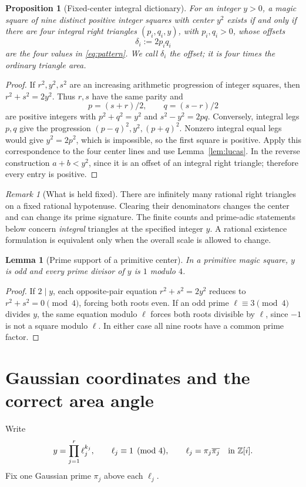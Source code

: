 \documentclass[11pt,letterpaper]{article}
\newtheorem{proposition}[theorem]{Proposition}
\newtheorem{lemma}[theorem]{Lemma}
\theoremstyle{definition}\newtheorem{definition}[theorem]{Definition}
\theoremstyle{remark}\newtheorem{remark}[theorem]{Remark}
\begin{document}
\begin{proposition}[Fixed-center integral dictionary]\label{prop:dictionary}
For an integer $y>0$, a magic square of nine distinct positive integer squares with center $y^2$ exists if and only if there are four integral right triangles $(p_i,q_i,y)$, with $p_i,q_i>0$, whose offsets
\[
\delta_i:=2p_iq_i
\]
are the four values in \eqref{eq:pattern}. We call $\delta_i$ the \emph{offset}; it is four times the ordinary triangle area.
\end{proposition}
\begin{proof}
If $r^2,y^2,s^2$ are an increasing arithmetic progression of integer squares, then $r^2+s^2=2y^2$. Thus $r,s$ have the same parity and
\[
p=(s+r)/2,\qquad q=(s-r)/2
\]
are positive integers with $p^2+q^2=y^2$ and $s^2-y^2=2pq$. Conversely, integral legs $p,q$ give the progression $(p-q)^2,y^2,(p+q)^2$. Nonzero integral equal legs would give $y^2=2p^2$, which is impossible, so the first square is positive. Apply this correspondence to the four center lines and use Lemma~\ref{lem:lucas}. In the reverse construction $a+b<y^2$, since it is an offset of an integral right triangle; therefore every entry is positive.
\end{proof}

\begin{remark}[What is held fixed]
There are infinitely many rational right triangles on a fixed rational hypotenuse. Clearing their denominators changes the center and can change its prime signature. The finite counts and prime-adic statements below concern \emph{integral} triangles at the specified integer $y$. A rational existence formulation is equivalent only when the overall scale is allowed to change.
\end{remark}

\begin{lemma}[Prime support of a primitive center]\label{lem:support}
In a primitive magic square, $y$ is odd and every prime divisor of $y$ is $1$ modulo $4$.
\end{lemma}
\begin{proof}
If $2\mid y$, each opposite-pair equation $r^2+s^2=2y^2$ reduces to $r^2+s^2=0\pmod4$, forcing both roots even. If an odd prime $\ell\equiv3\pmod4$ divides $y$, the same equation modulo $\ell$ forces both roots divisible by $\ell$, since $-1$ is not a square modulo $\ell$. In either case all nine roots have a common prime factor.
\end{proof}

\section{Gaussian coordinates and the correct area angle}\label{sec:gaussian}
Write
\[
y=\prod_{j=1}^r\ell_j^{k_j},\qquad \ell_j\equiv1\pmod4,
\qquad \ell_j=\pi_j\overline{\pi_j}\quad\text{in }\mathbb Z[i].
\]
Fix one Gaussian prime $\pi_j$ above each $\ell_j$.
\end{document}
